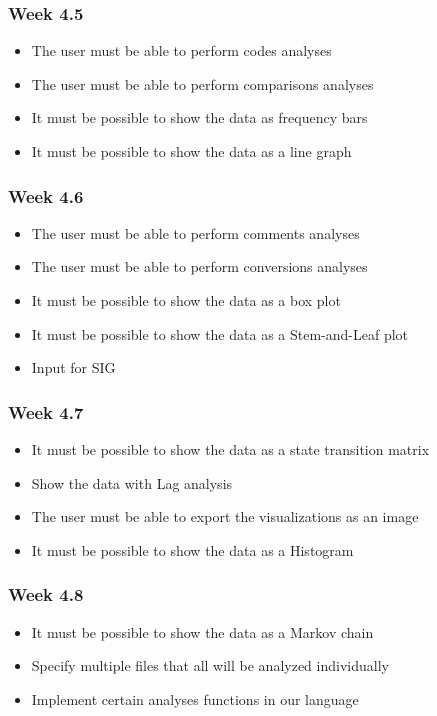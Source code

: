 \subsubsection{Week 4.5}
\begin{itemize}
	\item The user must be able to perform codes analyses
	\item The user must be able to perform comparisons analyses
	\item It must be possible to show the data as frequency bars
	\item It must be possible to show the data as a line graph
\end{itemize}
\subsubsection{Week 4.6}
\begin{itemize}
	\item The user must be able to perform comments analyses
	\item The user must be able to perform conversions analyses
	\item It must be possible to show the data as a box plot
	\item It must be possible to show the data as a Stem-and-Leaf plot
	\item Input for SIG
\end{itemize}
\subsubsection{Week 4.7}
\begin{itemize}
	\item It must be possible to show the data as a state transition matrix
	\item Show the data with Lag analysis
	\item The user must be able to export the visualizations as an image
	\item It must be possible to show the data as a Histogram
\end{itemize}
\subsubsection{Week 4.8}
\begin{itemize}
	\item It must be possible to show the data as a Markov chain
	\item Specify multiple files that all will be analyzed individually
	\item Implement certain analyses functions in our language
\end{itemize}
